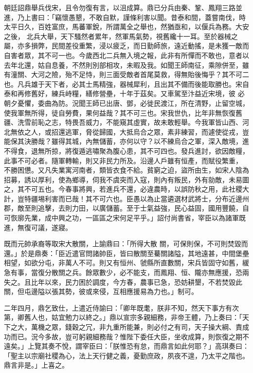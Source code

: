 \begin{pinyinscope}
 朝廷詔鼎舉兵伐宋，且令勿復有言，以沮成算。鼎已分兵由秦、鞏、鳳翔三路並進，乃上書曰：「竊懷愚懇，不敢自默，謹條利害以聞。昔泰和間，蓋嘗南伐，時太平日久，百姓富庶，馬蕃軍銳，所謂萬全之舉也，然猶亟和，以偃兵為務。大安之後，
 北兵大舉，天下騷然者累年，然軍馬氣勢，視舊纔十一耳。至於器械之屬，亦多損弊，民間差役重繁，浸以疲乏，而日勤師旅，遠近動搖，是未獲一敵而自害者眾，其不可一也。今歲西北二兵無入境之報，此非有所憚而不敢也，意者以去年北還，姑自息養，不然則別部相攻，未暇及我。如聞王師南征，乘隙併至，雖有潼關、大河之險，殆不足恃，則三面受敵者首尾莫救，得無貽後悔乎？其不可二也。凡兵雄于天下者，必其士馬精強，器械犀利，且出其不備而後能取勝也。宋自泰和再修舊好，練兵峙糧，繕修營壘，十年于茲矣。又車駕至汴益近宋境，彼
 必朝夕憂懼，委曲為防。況聞王師已出唐、鄧，必徙民渡江，所在清野，止留空城，使我軍無所得，徒自勞費，果何益哉？其不可三也。宋我世仇，比年非無恢復舊疆、洗雪前恥之志，特畏吾威力，不能窺其虛實，故未敢輕舉。今我軍皆山西、河北無依之人，或招還逃軍，脅從歸國，大抵烏合之眾，素非練習，而遽使從戎，豈能保其決勝哉？雖得其城，內無儲蓄，亦何以守？以不練烏合之軍，深入敵境，進不得食，退無所掠，將復遁逃嘯聚為腹心患，其不可四也。發兵進討，欲因敵糧，此事不可必者。隨軍轉輸，則又非民力所及。沿邊人戶雖有恒產，而賦役繁重，
 不勝困憊。又凡失業寓河南者，類皆衣食不給。貧窮之迫，盜所由生，如宋人陰為招募，誘以厚利，使為鄉導，伺我不虞突而入寇，則內有叛民，外有勍敵，未易圖之，其不可五也。今春事將興，若進兵不還，必違農時，以誤防秋之用，此社稷大計，豈特疆埸利害而已哉！其不可六也。臣愚以為止當遴選材武將士，分布近邊州郡，敵至則追擊，去則力田，以廣儲蓄。至于士氣益強，民心益固，國用豐饒，自可恢廓先業，成中興之功，一區區之宋何足平乎。」詔付尚書省，宰臣以為諸軍既進，無復可議，遂寢。



 既而元帥承裔等取宋大散關，上諭鼎曰：「所得大散
 關，可保則保，不可則焚毀而還。」於是鼎奏：「臣近遣官問諸帥臣，皆曰散關至驀關諸隘，其地遠甚，中間堡壘相望，如欲分屯，非萬人不可。則又有恒州、虢縣所直數關，宋兵皆固守如舊，緩急有事，當復分散關之兵。餘眾數少，必不能支，而鳳翔、恒、隴亦無應援，恐兩失之。且比年以來，民力困於調度，今方春，農事已急，恐妨耕墾，不若焚毀此關，但屯邊隘以張其勢，彼或來侵，互相應援易為力也。」制可。



 二年四月，鼎乞致仕，上遣近侍諭曰：「卿年既耄，朕非不知，然天下事方有次第，卿舊人也，姑宜勉力以終之。」鼎以宣宗多親細務，非帝王體，乃上奏曰：「天
 下之大，萬機之眾，錢穀之冗，非九重所能兼，則必付之有司，天子操大綱、責成功而已。況今多故，豈可躬親細務哉？惟陛下委任大臣，坐收成算，則恢復之期不遠矣。」上覽其奏不悅，謂宰臣曰：「朕惟恐有怠，而鼎言如此何耶？」高琪奏曰：「聖主以宗廟社稷為心，法上天行健之義，憂勤庶政，夙夜不遑，乃太平之階也。鼎言非是。」上喜之。




\end{pinyinscope}
